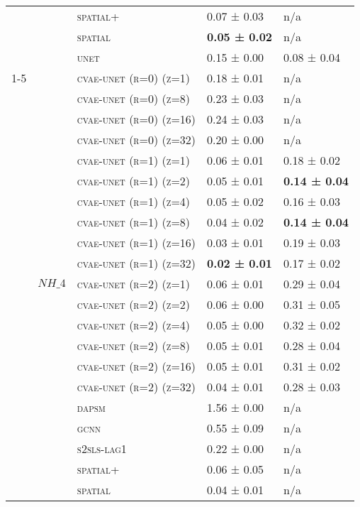 \documentclass{article}
\begin{document}
\begin{table}[!tbp]
\begin{tabular}{lllll}
 &  & \textsc{spatial+} & 0.07 ± { 0.03} & n/a \\
 &  & \textsc{spatial} & \bf 0.05 ± { 0.02} & n/a \\
 &  & \textsc{unet} & 0.15 ± { 0.00} & 0.08 ± { 0.04} \\
\cline{1-5} \cline{2-5}
\multirow[t]{44}{*}{$ (SC)\; SO\_{4} \;\to\; PM\_{2.5}\; (r=1) $} & \multirow[t]{22}{*}{$ NH\_{4} $} & \textsc{cvae-unet (r=0) (z=1)} & 0.18 ± { 0.01} & n/a \\
 &  & \textsc{cvae-unet (r=0) (z=8)} & 0.23 ± { 0.03} & n/a \\
 &  & \textsc{cvae-unet (r=0) (z=16)} & 0.24 ± { 0.03} & n/a \\
 &  & \textsc{cvae-unet (r=0) (z=32)} & 0.20 ± { 0.00} & n/a \\
 &  & \textsc{cvae-unet (r=1) (z=1)} & 0.06 ± { 0.01} & 0.18 ± { 0.02} \\
 &  & \textsc{cvae-unet (r=1) (z=2)} & 0.05 ± { 0.01} & \bf 0.14 ± { 0.04} \\
 &  & \textsc{cvae-unet (r=1) (z=4)} & 0.05 ± { 0.02} & 0.16 ± { 0.03} \\
 &  & \textsc{cvae-unet (r=1) (z=8)} & 0.04 ± { 0.02} & \bf 0.14 ± { 0.04} \\
 &  & \textsc{cvae-unet (r=1) (z=16)} & 0.03 ± { 0.01} & 0.19 ± { 0.03} \\
 &  & \textsc{cvae-unet (r=1) (z=32)} & \bf 0.02 ± { 0.01} & 0.17 ± { 0.02} \\
 &  & \textsc{cvae-unet (r=2) (z=1)} & 0.06 ± { 0.01} & 0.29 ± { 0.04} \\
 &  & \textsc{cvae-unet (r=2) (z=2)} & 0.06 ± { 0.00} & 0.31 ± { 0.05} \\
 &  & \textsc{cvae-unet (r=2) (z=4)} & 0.05 ± { 0.00} & 0.32 ± { 0.02} \\
 &  & \textsc{cvae-unet (r=2) (z=8)} & 0.05 ± { 0.01} & 0.28 ± { 0.04} \\
 &  & \textsc{cvae-unet (r=2) (z=16)} & 0.05 ± { 0.01} & 0.31 ± { 0.02} \\
 &  & \textsc{cvae-unet (r=2) (z=32)} & 0.04 ± { 0.01} & 0.28 ± { 0.03} \\
 &  & \textsc{dapsm} & 1.56 ± { 0.00} & n/a \\
 &  & \textsc{gcnn} & 0.55 ± { 0.09} & n/a \\
 &  & \textsc{s2sls-lag1} & 0.22 ± { 0.00} & n/a \\
 &  & \textsc{spatial+} & 0.06 ± { 0.05} & n/a \\
 &  & \textsc{spatial} & 0.04 ± { 0.01} & n/a \\

\end{tabular}
\end{table}
\end{document}
